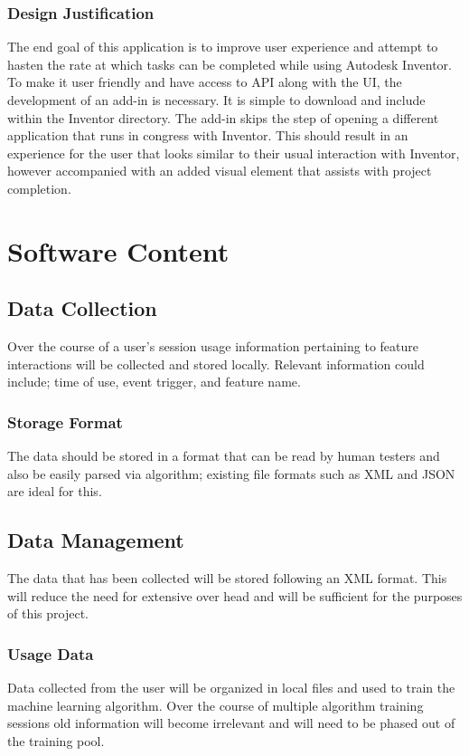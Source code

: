 \documentclass[onecolumn, draftclsnofoot,10pt, compsoc]{IEEEtran}
\begin{document}
\subsubsection{Design Justification}
The end goal of this application is to improve user experience and attempt to hasten the rate at which tasks can be completed while using Autodesk Inventor. To make it user friendly and have access to API along with the UI, the development of an add-in is necessary. It is simple to download and include within the Inventor directory. The add-in skips the step of opening a different application that runs in congress with Inventor. This should result in an experience for the user that looks similar to their usual interaction with Inventor, however accompanied with an added visual element that assists with project completion. 
\null\newpage
\section{Software Content}
\subsection{Data Collection}
Over the course of a user's session usage information pertaining to feature interactions will be collected and stored locally.  Relevant information could include; time of use, event trigger, and feature name. 
\subsubsection{Storage Format}
The data should be stored in a format that can be read by human testers and also be easily parsed via algorithm; existing file formats such as XML and JSON are ideal for this.
\subsection{Data Management}
The data that has been collected will be stored following an XML format. This will reduce the need for extensive over head and will be sufficient for the purposes of this project. 
\subsubsection{Usage Data}
Data collected from the user will be organized in local files and used to train the machine learning algorithm.
Over the course of multiple algorithm training sessions old information will become irrelevant and will need to be phased out of the training pool.
\end{document}
